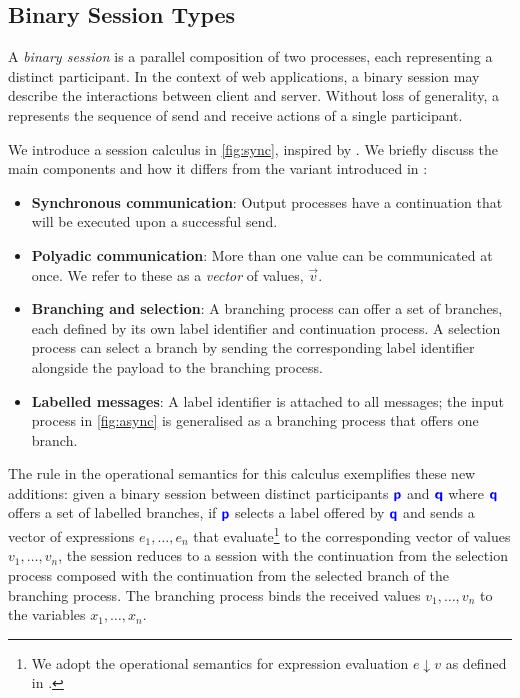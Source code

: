 \subsection{Binary Session Types}
\label{subsection:bgbst}

A \textit{binary session} is a parallel composition 
of two processes, each representing a distinct participant.
In the context of web applications, a binary session may
describe the interactions between client and server.
Without loss of generality, a  represents 
the sequence of send and receive actions of a single participant.

We introduce a  session calculus 
in \cref{fig:sync},
inspired by \cite{MPST}. 
We briefly discuss the main components and 
how it differs from the variant introduced in \cite{C406Lecture}:

\begin{itemize}
\item \textbf{Synchronous communication}: 
Output processes have a continuation that will be executed upon
a successful send.

\item \textbf{Polyadic communication}: 
More than one value can be communicated at once.
We refer to these as a \textit{vector} of values, $\vec v$.

\item \textbf{Branching and selection}: 
A branching process can offer a set of branches, 
each defined by its own label identifier and continuation process. 
A selection process can select a branch by 
sending the corresponding label identifier 
alongside the payload to the branching process.

\item \textbf{Labelled messages}: 
A label identifier is attached to all messages; 
the input process in \cref{fig:async}
is generalised as a branching process that offers one branch.
\end{itemize}

The  rule in the operational semantics 
for this calculus exemplifies these new additions: 
given a binary session between distinct participants 
${\color{blue}\bm{\mathsf{p}}}$ and ${\color{blue}\bm{\mathsf{q}}}$ 
where ${\color{blue}\bm{\mathsf{q}}}$ offers a set of labelled branches,
if ${\color{blue}\bm{\mathsf{p}}}$ selects a label offered by ${\color{blue}\bm{\mathsf{q}}}$ and 
sends a vector of expressions $e_1, \dots, e_n$ 
that evaluate\footnote{
We adopt the operational semantics for 
expression evaluation $e \downarrow v$ 
as defined in \cite{C406Lecture}.
} to the corresponding vector of values 
$v_1, \dots, v_n$, 
the session reduces to a session with 
the continuation from the selection process 
composed with the continuation from the selected branch 
of the branching process.
The branching process binds the received values
$v_1, \dots, v_n$ to the variables $x_1, \dots, x_n$.

